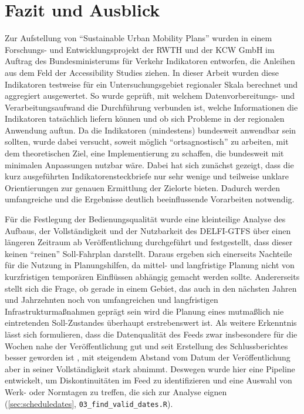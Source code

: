 \documentclass[11pt,pdftex,a4paper]{scrartcl}
\begin{document}
\section{Fazit und Ausblick}
Zur Aufstellung von \enquote{Sustainable Urban Mobility Plans} wurden in einem Forschungs- und Entwicklungsprojekt der RWTH und der KCW GmbH \parencite{kcwgmbhMethodikUndEmpfehlungen2024} im Auftrag des Bundesministerums für Verkehr \parencite{bmdvForschungsprojektIndikatorenNachhaltiger2023} Indikatoren entworfen, die Anleihen aus dem Feld der Accessibility Studies ziehen. In dieser Arbeit wurden diese Indikatoren testweise für ein Untersuchungsgebiet regionaler Skala berechnet und aggregiert ausgewertet. So wurde geprüft, mit welchem Datenvorbereitungs- und Verarbeitungsaufwand die Durchführung verbunden ist, welche Informationen die Indikatoren tatsächlich liefern können und ob sich Probleme in der regionalen Anwendung auftun. Da die Indikatoren (mindestens) bundesweit anwendbar sein sollten, wurde dabei versucht, soweit möglich \enquote{ortsagnostisch} zu arbeiten, mit dem theoretischen Ziel, eine Implementierung zu schaffen, die bundesweit mit minimalen Anpassungen nutzbar wäre. Dabei hat sich zunächst gezeigt, dass die kurz ausgeführten Indikatorensteckbriefe nur sehr wenige und teilweise unklare Orientierungen zur genauen Ermittlung der Zielorte bieten. Dadurch werden umfangreiche und die Ergebnisse deutlich beeinflussende Vorarbeiten notwendig.

Für die Festlegung der Bedienungsqualität wurde eine kleinteilige Analyse des Aufbaus, der Vollständigkeit und der Nutzbarkeit des DELFI-GTFS über einen längeren Zeitraum ab Veröffentlichung durchgeführt und festgestellt, dass dieser keinen \enquote{reinen} Soll-Fahrplan darstellt. Daraus ergeben sich einerseits Nachteile für die Nutzung in Planungshilfen, da mittel- und langfristige Planung nicht von kurzfristigen temporären Einflüssen abhängig gemacht werden sollte. Andererseits stellt sich die Frage, ob gerade in einem Gebiet, das auch in den nächsten Jahren und Jahrzehnten noch von umfangreichen und langfristigen Infrastrukturmaßnahmen geprägt sein wird \parencite[vgl.][Kapitel B5 nur zu Maßnahmen im SPNV]{gorhlMobilitaetsplanSPNVNahverkehrsplan2025} die Planung eines mutmaßlich nie eintretenden Soll-Zustandes überhaupt erstrebenswert ist. Als weitere Erkenntnis lässt sich formulieren, dass die Datenqualität des Feeds zwar insbesondere für die Wochen nahe der Veröffentlichung gut und seit Erstellung des Schlussberichtes besser geworden ist \parencite[vgl. auch][80, Fußnoten 35 und 36 auf Seite 88]{kcwgmbhMethodikUndEmpfehlungen2024}, mit steigendem Abstand vom Datum der Veröffentlichung aber in seiner Vollständigkeit stark abnimmt. Deswegen wurde hier eine Pipeline entwickelt, um Diskontinuitäten im Feed zu identifizieren und eine Auswahl von Werk- oder Normtagen zu treffen, die sich zur Analyse eignen (\ref{sec:scheduledates}, \texttt{03\_find\_valid\_dates.R}).
\end{document}
